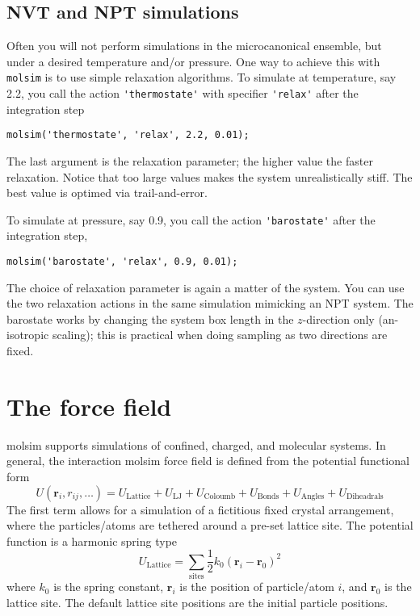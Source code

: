 \documentclass[11pt]{article}
\begin{document}
\subsection{NVT and NPT simulations}
Often you will not perform simulations in the microcanonical ensemble, but under
a desired temperature and/or pressure. One way to achieve this with
\verb!molsim! is to use simple relaxation algorithms. To simulate at
temperature, say 2.2, you call the action \verb!'thermostate'! with specifier
\verb!'relax'! after the integration step
\begin{verbatim}
molsim('thermostate', 'relax', 2.2, 0.01);
\end{verbatim}
The last argument is the relaxation parameter; the higher value the faster
relaxation. Notice that too large values makes the system unrealistically
stiff. The best value is optimed via trail-and-error.

To simulate at pressure, say 0.9, you call the action \verb!'barostate'! after
the integration step,
\begin{verbatim}
molsim('barostate', 'relax', 0.9, 0.01);
\end{verbatim}
The choice of relaxation parameter is again a matter of the system. You can use
the two relaxation actions in the same simulation mimicking an NPT system. The
barostate works by changing the system box length in the $z$-direction only
(an-isotropic scaling); this is practical when doing sampling as two directions
are fixed.

\section{The force field}
\textsf{molsim} supports simulations of confined, charged, and molecular
systems. In general, the interaction \textsf{molsim} force field is defined from
the potential functional form
\begin{equation}
  U(\mathbf{r}_i, r_{ij}, \ldots)
  =  U_\mathrm{Lattice} + U_\mathrm{LJ} + U_{\mathrm{Coloumb}} +
  U_\mathrm{Bonds} + U_\mathrm{Angles} + 
  U_\mathrm{Diheadrals}
\end{equation}
The first term allows for a simulation of a fictitious fixed crystal
arrangement, where the particles/atoms are tethered around a pre-set lattice
site. The potential function is a harmonic spring type
\begin{equation}
  U_\mathrm{Lattice} =
  \sum_\mathrm{sites} \frac{1}{2}k_0 (\mathbf{r}_i - \mathbf{r}_0)^2
\end{equation}
where $k_0$ is the spring constant, $\mathbf{r}_i$ is the position of
particle/atom $i$, and $\mathbf{r}_0$ is the lattice site. The default
lattice site positions are the initial particle positions.
\end{document}

